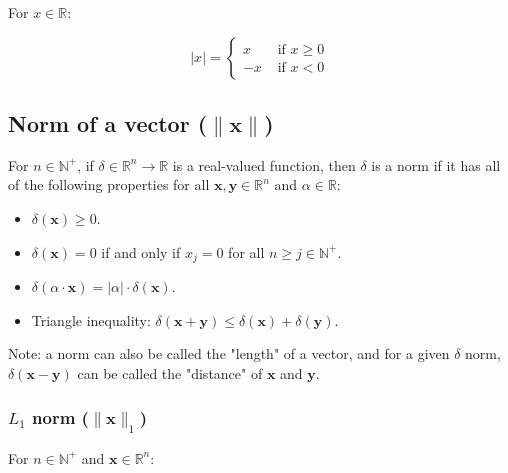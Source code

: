 \documentclass[titlepage]{article}
\begin{document}
        For $x \in \mathbb{R}$:

        \begin{equation*}
          | x | = \begin{cases}
              x & \text{ if } x \geq 0 \\
              -x & \text{ if } x < 0
          \end{cases}
        \end{equation*}

      \subsection{Norm of a vector ($\| \mathbf{x} \|$)}

        For $n \in \mathbb{N}^+$, if
        $\delta \in \mathbb{R}^n \rightarrow \mathbb{R}$ is a
        real-valued function, then $\delta$ is a norm if it has all of the
        following properties for all $\mathbf{x}, \mathbf{y} \in \mathbb{R}^n$
        and $\alpha \in \mathbb{R}$:

        \begin{itemize}
          \item $\delta(\mathbf{x}) \geq 0$.

          \item $\delta(\mathbf{x}) = 0$ if and only if $x_j = 0$ for all
                $n \geq j \in \mathbb{N}^+$.

          \item $
                  \delta(\alpha \cdot \mathbf{x})
                    = |\alpha| \cdot \delta(\mathbf{x})
                $.

          \item Triangle inequality: $
                  \delta(\mathbf{x} + \mathbf{y}) \leq
                    \delta(\mathbf{x}) + \delta(\mathbf{y})
                $.
        \end{itemize}

        Note: a norm can also be called the "length" of a vector, and for a
        given $\delta$ norm, $\delta(\mathbf{x} - \mathbf{y})$ can be called
        the "distance" of $\mathbf{x}$ and $\mathbf{y}$.

        \subsubsection{$L_1$ norm ($\| \mathbf{x} \|_1$)}

          For $n \in \mathbb{N}^+$ and $\mathbf{x} \in \mathbb{R}^n$:
\end{document}
